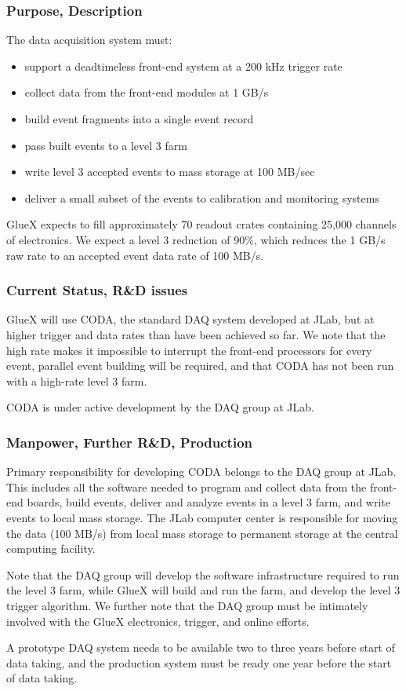 \subsubsection*{Purpose, Description}

The data acquisition system must:
\begin{itemize}
\item support a deadtimeless front-end system at a 200 kHz trigger rate
\item collect data from the front-end modules at 1 GB/s
\item build event fragments into a single event record
\item pass built events to a level 3 farm
\item write level 3 accepted events to mass storage at 100 MB/sec
\item deliver a small subset of the events to calibration and
  monitoring systems
\end{itemize}

GlueX expects to fill approximately 70 readout crates 
containing 25,000 channels of electronics. 
We expect a level 3 reduction of 90\%, which reduces the 1 GB/s raw
rate to an accepted event data rate of 100 MB/s.

\subsubsection*{Current Status, R\&D issues}

GlueX will use CODA, the standard DAQ system developed at JLab, but at
higher trigger and data rates than have been achieved so far.  We note
that the high rate makes it impossible to interrupt the front-end
processors for every event, parallel event building will be required,
and that CODA has not been run with a high-rate level 3 farm.

CODA is under active development by the DAQ group at JLab.



\subsubsection*{Manpower, Further R\&D, Production}

Primary responsibility for developing CODA belongs to the DAQ group at
JLab.  This includes all the software needed to  
program and collect data from the front-end boards,
build events,
deliver and analyze events in a level 3 farm,
and write events to local mass storage.
The JLab computer center is responsible for moving the data (100
MB/s) from local mass storage to permanent storage at the central
computing facility.

Note that the DAQ group will develop the software infrastructure
required to run the level 3 farm, while GlueX will build and run the
farm, and develop the level 3 trigger algorithm.  We further note that
the DAQ group must be intimately involved with the GlueX electronics,
trigger, and online efforts.

A prototype DAQ system needs to be available two to three years before
start of data taking, and the production system must be ready one year
before the start of data taking.

